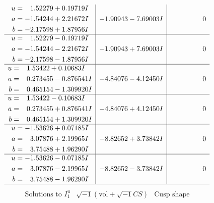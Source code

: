 \documentclass[1p]{elsarticle_modified}
\theoremstyle{definition}
\newcommand{\I}{\sqrt{-1}}
\begin{document}
$$\begin{array}{c|c|c}
\begin{aligned}
u &= \phantom{-}1.52279 + 0.19719 I \\
a &= -1.54244 + 2.21672 I \\
b &= -2.17598 + 1.87956 I\end{aligned}
 & -1.90943 - 7.69003 I & \phantom{-0.000000 } 0 \\ \hline\begin{aligned}
u &= \phantom{-}1.52279 - 0.19719 I \\
a &= -1.54244 - 2.21672 I \\
b &= -2.17598 - 1.87956 I\end{aligned}
 & -1.90943 + 7.69003 I & \phantom{-0.000000 } 0 \\ \hline\begin{aligned}
u &= \phantom{-}1.53422 + 0.10683 I \\
a &= \phantom{-}0.273455 - 0.876541 I \\
b &= \phantom{-}0.465154 - 1.309920 I\end{aligned}
 & -4.84076 - 4.12450 I & \phantom{-0.000000 } 0 \\ \hline\begin{aligned}
u &= \phantom{-}1.53422 - 0.10683 I \\
a &= \phantom{-}0.273455 + 0.876541 I \\
b &= \phantom{-}0.465154 + 1.309920 I\end{aligned}
 & -4.84076 + 4.12450 I & \phantom{-0.000000 } 0 \\ \hline\begin{aligned}
u &= -1.53626 + 0.07185 I \\
a &= \phantom{-}3.07876 + 2.19965 I \\
b &= \phantom{-}3.75488 + 1.96290 I\end{aligned}
 & -8.82652 + 3.73842 I & \phantom{-0.000000 } 0 \\ \hline\begin{aligned}
u &= -1.53626 - 0.07185 I \\
a &= \phantom{-}3.07876 - 2.19965 I \\
b &= \phantom{-}3.75488 - 1.96290 I\end{aligned}
 & -8.82652 - 3.73842 I & \phantom{-0.000000 } 0\\
 \hline 
 \end{array}$$\newpage$$\begin{array}{c|c|c}  
\text{Solutions to }I^u_{1}& \I (\text{vol} + \sqrt{-1}CS) & \text{Cusp shape}\\
 \hline 
\begin{aligned}

\end{aligned}
\end{array}$$
\end{document}
